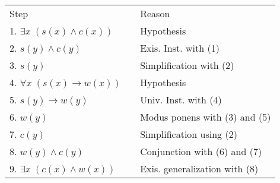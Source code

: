 \documentclass[12pt,addpoints]{exam}
\newcommand{\ra}{\rightarrow}
\begin{document}
\begin{questions}
\begin{solution}
\begin{itemize}[itemsep=0pt,parsep=0pt,topsep=0pt,partopsep=0pt]
    \smallskip
    \begin{tabular}{lll}
        Step        & \hspace{0.2in} & Reason \\
        1. $\exists x\; (s(x) \wedge c(x))$  &   & Hypothesis \\
        2. $s(y) \wedge c(y)$               &   & Exis. Inst. with (1) \\
        3. $s(y)$                           &   & Simplification with (2) \\
        4. $\forall x\; (s(x) \rightarrow w(x))$ &  & Hypothesis \\
        5. $s(y) \rightarrow w(y)$          & & Univ. Inst. with (4) \\
        6. $w(y)$                           & & Modus ponens with (3) and (5) \\
        7. $c(y)$                           & & Simplification using (2) \\
        8. $w(y) \wedge c(y)$               & & Conjunction with (6) and (7) \\
        9. $\exists x\; (c(x) \wedge w(x))$ &   & Exis. generalization with (8) \\
    \end{tabular}
%
%

\end{itemize}
\end{solution}
\end{questions}
\end{document}
